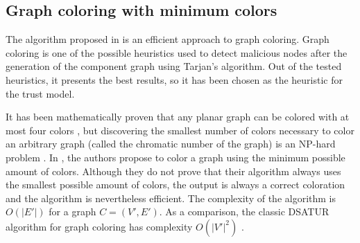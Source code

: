 \documentclass[conference]{IEEEtran}
\begin{document}
%
%
%
%		
%	
%
%

\subsection{Graph coloring with minimum colors}
\label{section:coloring}
The algorithm proposed in \cite{mittal2011graph} is an efficient approach to graph coloring.
Graph coloring is one of the possible heuristics used to detect malicious nodes after the generation of the component graph using Tarjan's algorithm.
Out of the tested heuristics, it presents the best results, so it has been chosen as the heuristic for the trust model.

It has been mathematically proven that any planar graph can be colored with at most four colors \cite{appel1976every}, but discovering the smallest number of colors necessary to color an arbitrary graph (called the chromatic number of the graph) is an NP-hard problem \cite{sanchez1989determining}.
In \cite{mittal2011graph}, the authors propose to color a graph using the minimum possible amount of colors.
Although they do not prove that their algorithm always uses the smallest possible amount of colors, the output is always a correct coloration and the algorithm is nevertheless efficient.
The complexity of the algorithm is $O(|E'|)$ for a graph $C = (V',E')$.
As a comparison, the classic DSATUR algorithm for graph coloring has complexity $O(|V'|^2)$ \cite{brelaz1979new}.
\end{document}
